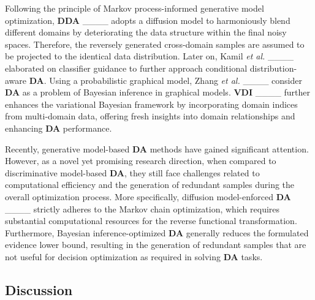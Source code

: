 Following the principle of Markov process-informed generative model optimization, \textbf{DDA} ____ adopts a diffusion model to harmoniously blend different domains by deteriorating the data structure within the final noisy spaces. Therefore, the reversely generated cross-domain samples are assumed to be projected to the identical data distribution. Later on, Kamil \textit{et al.} ____ elaborated on classifier guidance to further approach conditional distribution-aware \textbf{DA}. Using a probabilistic graphical model, Zhang \textit{et al.} ____ consider \textbf{DA} as a problem of Bayesian inference in graphical models. \textbf{VDI} ____ further enhances the variational Bayesian framework by incorporating domain indices from multi-domain data, offering fresh insights into domain relationships and enhancing \textbf{DA} performance.



Recently, generative model-based \textbf{DA} methods have gained significant attention. However, as a novel yet promising research direction, when compared to discriminative model-based \textbf{DA}, they still face challenges related to computational efficiency and the generation of redundant samples during the overall optimization process. More specifically, diffusion model-enforced \textbf{DA} ____ strictly adheres to the Markov chain optimization, which requires substantial computational resources for the reverse functional transformation. Furthermore, Bayesian inference-optimized \textbf{DA} generally reduces the formulated evidence lower bound, resulting in the generation of redundant samples that are not useful for decision optimization as required in solving \textbf{DA} tasks.



\subsection{Discussion}
\label{Discussion}


